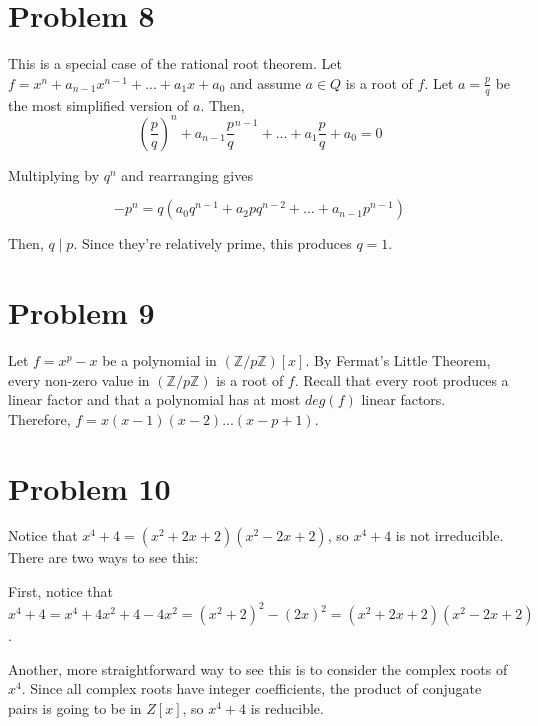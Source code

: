 \documentclass{article}
\theoremstyle{definition}
\begin{document}
\section{Problem 8}

This is a special case of the rational root theorem. Let $f = x^{n} + a_{n-1}x^{n-1} + ... + a_{1}x + a_{0}$ and assume $a \in Q$ is a root of $f$. Let $a = \frac{p}{q}$ be the most simplified version of $a$. Then, \[(\frac{p}{q})^{n} + a_{n-1}\frac{p}{q}^{n-1} + ... + a_{1}\frac{p}{q} + a_{0} = 0\]

Multiplying by $q^{n}$ and rearranging gives

\[ -p^{n} = q(a_{0}q^{n-1} + a_{2}pq^{n-2} + ... + a_{n-1}p^{n-1})\]

Then, $q \mid p$. Since they're relatively prime, this produces $q = 1$.


\section{Problem 9}

Let $f = x^p -x$ be a polynomial in $(\mathbb{Z}/p\mathbb{Z})[x]$. By Fermat's Little Theorem, every non-zero value in $(\mathbb{Z}/p\mathbb{Z})$ is a root of $f$. Recall that every root produces a linear factor and that a polynomial has at most $deg(f)$ linear factors. Therefore, $f = x(x-1)(x-2)...(x-p+1)$. 


\section{Problem 10}

Notice that $x^{4} + 4 = (x^{2} + 2x + 2)(x^{2} - 2x + 2)$, so $x^{4} + 4$ is not irreducible. There are two ways to see this:

First, notice that $x^4 + 4 = x^4 + 4x^2 + 4 - 4x^2 = (x^2 + 2)^2 - (2x)^2 = (x^{2} + 2x + 2)(x^{2} - 2x + 2)$.

Another, more straightforward way to see this is to consider the complex roots of $x^{4}$. Since all complex roots have integer coefficients, the product of conjugate pairs is going to be in $Z[x]$, so $x^{4} + 4$ is reducible.
\end{document}
